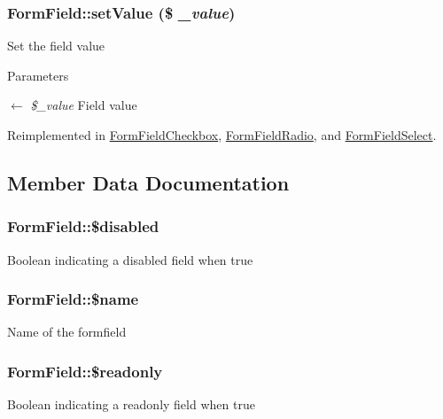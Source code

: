 \subsubsection[{setValue}]{\setlength{\rightskip}{0pt plus 5cm}FormField::setValue (\$ {\em \_\-value})}\label{classFormField_a465ff61e290d82be96bb793c3a14b3e7}
Set the field value 
\begin{DoxyParams}{Parameters}
\item[\mbox{$\leftarrow$} {\em \$\_\-value}]Field value \end{DoxyParams}


Reimplemented in \hyperlink{classFormFieldCheckbox_a787abee157599c389a18e0810f69fed5}{FormFieldCheckbox}, \hyperlink{classFormFieldRadio_aab105e92866fd80890d3254f51a2e4ca}{FormFieldRadio}, and \hyperlink{classFormFieldSelect_ae69f5b352df63796c048dca6a2de7544}{FormFieldSelect}.



\subsection{Member Data Documentation}
\subsubsection[{\$disabled}]{\setlength{\rightskip}{0pt plus 5cm}FormField::\$disabled}\label{classFormField_ab6f1907061890290e32cb2befc0a5f50}
Boolean indicating a disabled field when true 
\subsubsection[{\$name}]{\setlength{\rightskip}{0pt plus 5cm}FormField::\$name}\label{classFormField_a23861f707bcd77bbace6300de9621746}
Name of the formfield 
\subsubsection[{\$readonly}]{\setlength{\rightskip}{0pt plus 5cm}FormField::\$readonly}\label{classFormField_a78ba5d4b9127e75e8ccf86f397b5d9ac}
Boolean indicating a readonly field when true 
